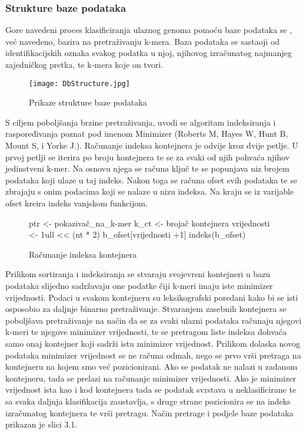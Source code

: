 \documentclass[times, utf8, zavrsni]{fer}
\begin{document}
{\subsubsection{Strukture baze podataka}
Gore navedeni proces klasificiranja ulaznog genoma pomoću baze podataka se , već navedeno, bazira na pretraživanju k-mera. Baza podataka se sastaoji od identifikacijskih oznaka svakog podatka u njoj, njihovog izračunatog najmanjeg zajedničkog pretka, te k-mera koje on tvori.\\
\begin{figure}[hbp]
	\centering
	\texttt{[image: DbStructure.jpg]}
	\caption{Prikaze strukture baze podataka}
	\label{BazaPodataka}
\end{figure}

S ciljem poboljšanja brzine pretraživanja, uvodi se algoritam indeksiranja i raspoređivanja poznat pod imenom Minimizer (Roberts M, Hayes W, Hunt B, Mount S, i Yorke J.). Računanje indeksa kontejnera je odvije kroz dvije petlje. U prvoj petlji se iterira po broju kontejnera te se za svaki od njih pohvaća njihov jedinstveni k-mer. Na osnovu njega se računa ključ te se popunjava niz brojem podataka koji ulaze u taj indeks. Nakon toga se računa ofset svih podataka te se zbrajaju s onim podacima koji se nalaze u nizu indeksa. Na kraju se iz varijable ofset kreira indeks vanjskom funkcijom.
 
\begin{figure}
	\begin{algorithm}[H]
		ptr <- pokazivač\_na\_k-mer\;
		k\_ct <- brojač kontejnera\;
		vrijednosti <- 1ull << (nt * 2)\;
		b\_ofset[vrijednosti +1]\;
		indeks(b\_ofset)\;
		\caption{Računanje indeksa kontejnera}
		\label{Indeks}
	\end{algorithm}
\end{figure}


Prilikom sortiranja i indeksiranja se stvaraju svojevrsni kontejneri u bazu podataka slijedno sadržavaju one podatke čiji k-meri imaju iste minimizer vrijednosti. Podaci u svakom kontejneru su leksikografski poredani kako bi se isti osposobio za daljnje binarno pretraživanje. Stvaranjem zasebnih kontejnera se poboljšava pretraživanje na način da se za svaki ulazni podataka računaju njegovi k-meri te njegove minimizer vrijednosti, te se pretragom liste indeksa dohvaća samo onaj kontejner koji sadrži istu minimizer vrijednost. Prilikom dolaska novog podataka minimizer vrijednost se ne računa odmah, nego se prvo vrši pretraga na kontejneru na kojem smo već pozicionirani. Ako se podatak ne nalazi u zadanom kontejneru, tada se prelazi na računanje minimizer vrijednosti. Ako je minimizer vrijednost ista kao i kod kontejnera tada se podatak svrstava u neklasificirane te sa svaka daljnja klasifikacija zaustavlja, s druge strane pozicionira se na indeks izračunatog kontejnera te vrši pretragu. Način pretrage i podjele baze podataka prikazan je slici 3.1.


}
\end{document}
